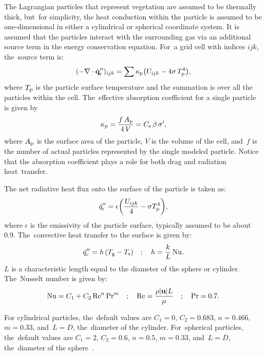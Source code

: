 \documentclass[atmosphere,article,accept,moreauthors,pdftex]{Definitions/mdpi}
\begin{document}
\begin{paracol}{2}
The Lagrangian particles that represent vegetation are assumed to be thermally thick, but~for simplicity, the heat conduction within the particle is assumed to be one-dimensional in either a cylindrical or spherical coordinate system. It is assumed that the particles interact with the surrounding gas via an additional source term in the energy conservation equation. For~a grid cell with indices $ijk$, the~source term is:
\begin{equation} \label{eq:qr}
   (-\nabla \cdot \dot{\mathbf{q}}_{\rm r}'')_{ijk} = \sum \kappa_{\rm p} \left( U_{ijk} - 4 \sigma \, T_{\rm p}^4 \right),
\end{equation}
where $T_{\rm p}$ is the particle surface temperature and the summation is over all the particles within the cell. The~effective absorption coefficient for a single particle is given by
\begin{equation}
   \kappa_{\rm p} = \frac{f \, A_{\rm p}}{4 \, V} = C_{\rm s}  \, \beta \, \sigma',
\end{equation}
where $A_{\rm p}$ is the surface area of the particle, $V$ is the volume of the cell, and~$f$ is the number of actual particles represented by the single modeled particle. Notice that the absorption coefficient plays a role for both drag and radiation heat~transfer.

The net radiative heat flux onto the surface of the particle is taken as:
\begin{equation}
   \dot{q}_{\rm r}'' = \epsilon \left( \frac{U_{ijk}}{4} - \sigma T_{\rm p}^4 \right),
\end{equation}
where $\epsilon$ is the emissivity of the particle surface, typically assumed to be about 0.9. The~convective heat transfer to the surface is given by:
\begin{equation}
   \dot{q}_{\rm c}'' = h \, (T_{\rm g} - T_{\rm s})  \quad ; \quad  h = \frac{k}{L} \, \hbox{Nu}  \label{q_con}.
\end{equation} 
$L$ is a characteristic length equal to the diameter of the sphere or cylinder. The~Nusselt number is given by:
\begin{equation}
   \hbox{Nu} = C_1 + C_2 \, \hbox{Re}^n \, \hbox{Pr}^m  \quad ; \quad \hbox{Re} = \frac{\rho |\mathbf{u}| L}{\mu} \quad ; \quad \hbox{Pr} = 0.7.
\end{equation}

For cylindrical particles, the~default values are $C_1=0$, $C_2=0.683$, $n=0.466$, $m=0.33$, and~$L=D$, the~diameter of the cylinder. For~spherical particles, the~default values are $C_1=2$, $C_2=0.6$, $n=0.5$, $m=0.33$, and~$L=D$, the~diameter of the sphere~\cite{Incropera:1}.



\end{paracol}
\end{document}
